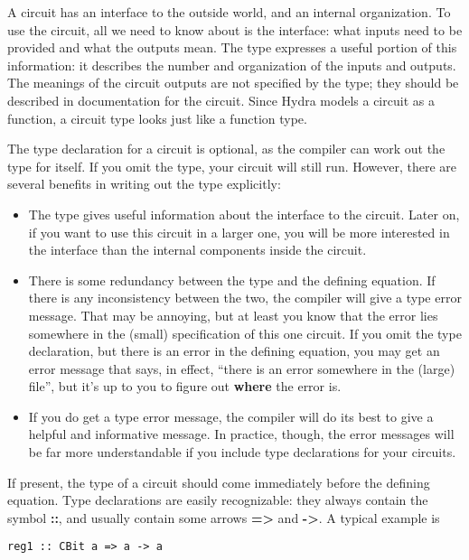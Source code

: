 \documentclass[11pt]{article}
\begin{document}
A circuit has an interface to the outside world, and an internal
organization.  To use the circuit, all we need to know about is the
interface: what inputs need to be provided and what the outputs mean.
The type expresses a useful portion of this information: it describes
the number and organization of the inputs and outputs.  The meanings
of the circuit outputs are not specified by the type; they should be
described in documentation for the circuit.  Since Hydra models a
circuit as a function, a circuit type looks just like a function type.

The type declaration for a circuit is optional, as the compiler can
work out the type for itself.  If you omit the type, your circuit will
still run.  However, there are several benefits in writing out the
type explicitly:

\begin{itemize}
\item The type gives useful information about the interface to the
circuit.  Later on, if you want to use this circuit in a larger one,
you will be more interested in the interface than the internal
components inside the circuit.

\item There is some redundancy between the type and the defining
equation.  If there is any inconsistency between the two, the
compiler will give a type error message.  That may be annoying, but
at least you know that the error lies somewhere in the (small)
specification of this one circuit.  If you omit the type
declaration, but there is an error in the defining equation, you may
get an error message that says, in effect, ``there is an error
somewhere in the (large) file'', but it's up to you to figure out
\textbf{where} the error is.

\item If you do get a type error message, the compiler will do its
best to give a helpful and informative message.  In practice,
though, the error messages will be far more understandable if you
include type declarations for your circuits.
\end{itemize}

If present, the type of a circuit should come immediately before the
defining equation.  Type declarations are easily recognizable: they
always contain the symbol \textbf{::}, and usually contain some arrows \textbf{=>}
and \textbf{->}.  A typical example is

\begin{verbatim}
reg1 :: CBit a => a -> a
\end{verbatim}
\end{document}
